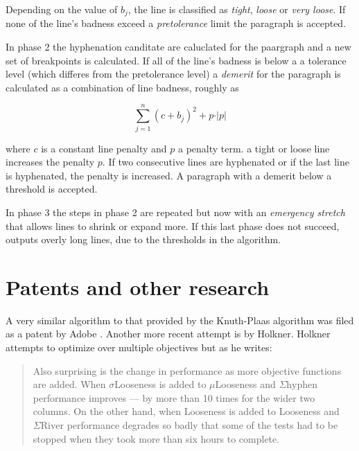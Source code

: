 {{\begin{description}
Depending on the value of $b_j$, the line is classified as \textit{tight}, \textit{loose} or  \textit{very loose}. If none of the line's badness exceed a \textit{pretolerance}  limit the paragraph is accepted. 

\item[Phase 2] In phase 2 the hyphenation canditate are caluclated for the paargraph and a new set of breakpoints is calculated. If all of the line's badness is below a a tolerance level  (which differes from the pretolerance level) a \textit{demerit} for the paragraph is calculated as a combination of line badness, roughly as

\begin{equation}
\sum_{j=1}^{n}  \left(c+b_j \right)^{2} + p \cdot \vert p\vert 
\end{equation}

where $c$ is a constant line penalty and $p$ a penalty term. a tight or loose line increases the penalty $p$. If two consecutive lines are hyphenated or if the last line is hyphenated, the penalty is increased. A paragraph with a demerit
below a threshold is accepted.

\item[Phase 3] In phase 3 the steps in phase 2 are repeated but now with an \textit{emergency stretch} that allows lines to shrink or expand more. If this last phase does not succeed, \tex outputs overly long lines, due to the thresholds in the algorithm.


\end{description}


\section{Patents and other research}

A very similar algorithm to that provided by the Knuth-Plaas algorithm was filed as a patent
by Adobe \cite{adobepatent}. Another more recent attempt is by Holkner\cite{Holkner2006}. Holkner attempts to optimize over multiple objectives but as he writes:

\begin{quote}
Also surprising is the change in performance as more objective functions are added. When
$\sigma$Looseness is added to $\mu$Looseness and $\Sigma\text{hyphen}$ performance improves --- by more than 10 times
for the wider two columns. On the other hand, when Looseness is added to Looseness and $\Sigma\text{River}$
performance degrades so badly that some of the tests had to be stopped when they took more than six
hours to complete.


\end{quote}}}
